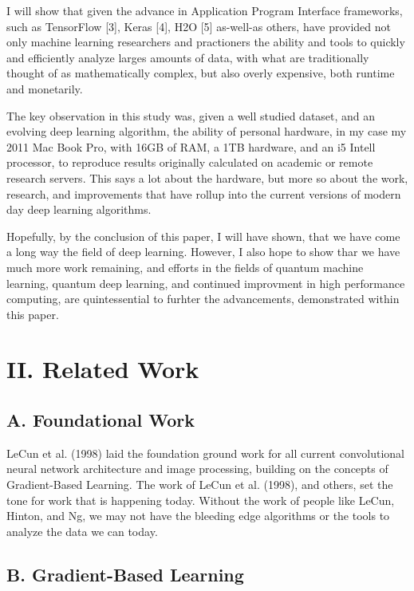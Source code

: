 \documentclass[conference,final,]{IEEEtran}
\begin{document}
I will show that given the advance in Application Program Interface
frameworks, such as TensorFlow {[}3{]}, Keras {[}4{]}, H2O {[}5{]}
as-well-as others, have provided not only machine learning researchers
and practioners the ability and tools to quickly and efficiently analyze
larges amounts of data, with what are traditionally thought of as
mathematically complex, but also overly expensive, both runtime and
monetarily.

The key observation in this study was, given a well studied dataset, and
an evolving deep learning algorithm, the ability of personal hardware,
in my case my 2011 Mac Book Pro, with 16GB of RAM, a 1TB hardware, and
an i5 Intell processor, to reproduce results originally calculated on
academic or remote research servers. This says a lot about the hardware,
but more so about the work, research, and improvements that have rollup
into the current versions of modern day deep learning algorithms.

Hopefully, by the conclusion of this paper, I will have shown, that we
have come a long way the field of deep learning. However, I also hope to
show thar we have much more work remaining, and efforts in the fields of
quantum machine learning, quantum deep learning, and continued
improvment in high performance computing, are quintessential to furhter
the advancements, demonstrated within this paper.

\section{II. Related Work}\label{ii.-related-work}

\subsection{A. Foundational Work}\label{a.-foundational-work}

LeCun et al. (1998) laid the foundation ground work for all current
convolutional neural network architecture and image processing, building
on the concepts of Gradient-Based Learning. The work of LeCun et al.
(1998), and others, set the tone for work that is happening today.
Without the work of people like LeCun, Hinton, and Ng, we may not have
the bleeding edge algorithms or the tools to analyze the data we can
today.

\subsection{B. Gradient-Based
Learning}\label{b.-gradient-based-learning}
\end{document}
